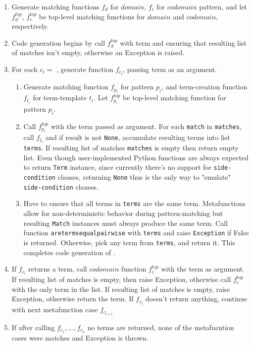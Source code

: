 \begin{enumerate}
\item Generate matching functions $f_d$ for $domain$, $f_c$ for $codomain$ pattern, and let $f_d^{top}$, $f_c^{top}$ be top-level matching functions for $domain$ and $codomain$, respectively.
\item Code generation begins by call $f_d^{top}$ with term and ensuring that resulting list of matches isn't empty, otherwise an Exception is raised.
\item For each $c_i =$ \MetafunctionCase, generate function $f_{c_i}$, passing term as an argument.
\begin{enumerate}
	\item Generate matching function $f_{p_i}$ for pattern $p_i$, and term-creation function $f_{t_i}$ for term-template $t_i$. Let $f_{p_i}^{top}$ be top-level matching function for pattern $p_i$.
	\item Call $f_{p_i}^{top}$ with the term passed as argument. For each \texttt{match} in \texttt{matches}, call $f_{t_i}$ and if result is not \texttt{None}, accumulate resulting terms into list \texttt{terms}. If resulting list of matches \texttt{matches} is empty then return empty list. Even though user-implemented Python functions are always expected to return \texttt{Term} instance, since currently there's no support for \texttt{side-condition} clauses, returning \texttt{None} thus is the only way to "emulate" \texttt{side-condition} clauses.
	\item Have to ensure that all terms in \texttt{terms} are the same term. Metafunctions allow for non-deterministic behavior during pattern-matching but resulting \texttt{Match} instances must always produce the same term. Call function \texttt{aretermsequalpairwise} with \texttt{terms} and raise \texttt{Exception} if False is returned. Otherwise, pick any term from \texttt{terms}, and return it.
	This completes code generation of \MetafunctionCase.
\end{enumerate}
\item If $f_{c_i}$ returns a term, call $codomain$ function $f_c^{top}$ with the term as argument. If resulting list of matches is empty, then raise Exception, otherwise call $f_c^{top}$ with the only term in the list. If resulting list of matches is empty, raise Exception, otherwise return the term. If $f_{c_i}$ doesn't return anything, continue with next metafunction case $f_{c_{i+1}}$
\item If after calling $f_{c_1}, ..., f_{c_n}$ no terms are returned, none of the metafucntion cases were matches and Exception is thrown.
\end{enumerate}

